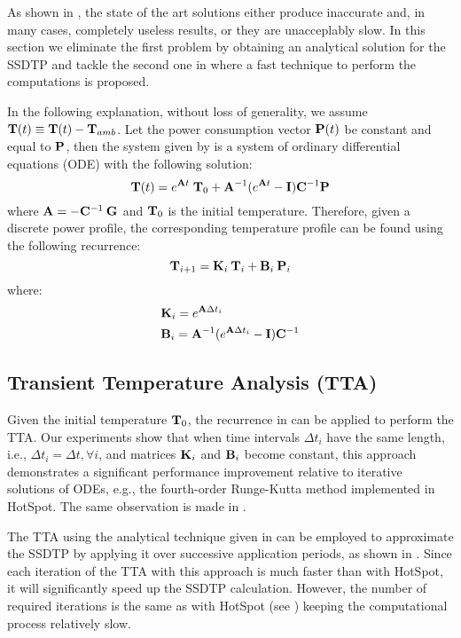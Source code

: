 As shown in , the state of the art solutions either produce inaccurate and, in many cases, completely useless results, or they are unacceplably slow. In this section we eliminate the first problem by obtaining an analytical solution for the SSDTP and tackle the second one in  where a fast technique to perform the computations is proposed.

In the following explanation, without loss of generality, we assume $\mathbf{T}(t) \equiv \mathbf{T}(t) - \mathbf{T}_{amb}$. Let the power consumption vector $\mathbf{P}(t)$ be constant and equal to $\mathbf{P}$, then the system given by  is a system of ordinary differential equations (ODE) with the following solution:
\begin{equation} \label{eq:solution}
  \mathbf{T}(t) = e^{\mathbf{A} t} \; \mathbf{T}_0 + \mathbf{A}^{-1}(e^{\mathbf{A} t} - \mathbf{I})\mathbf{C}^{-1} \mathbf{P}
\end{equation}
where $\mathbf{A} = -\mathbf{C}^{-1} \: \mathbf{G}$ and $\mathbf{T}_0$ is the initial temperature. Therefore, given a discrete power profile, the corresponding temperature profile can be found using the following recurrence:
\begin{equation} \label{eq:recurrent-system}
  \mathbf{T}_{i+1} = \mathbf{K}_i \: \mathbf{T}_i + \mathbf{B}_i \: \mathbf{P}_i
\end{equation}
where:
\begin{align*}
  & \mathbf{K}_i = e^{\mathbf{A} \Delta t_i} \\
  & \mathbf{B}_i = \mathbf{A}^{-1}(e^{\mathbf{A} \Delta t_i} - \mathbf{I})\mathbf{C}^{-1}
\end{align*}

\subsection{Transient Temperature Analysis (TTA)}
Given the initial temperature $\mathbf{T}_0$, the recurrence in  can be applied to perform the TTA. Our experiments show that when time intervals $\Delta t_i$ have the same length, i.e., $\Delta t_i = \Delta t, \forall i$, and matrices $\mathbf{K}_i$ and $\mathbf{B}_i$ become constant, this approach demonstrates a significant performance improvement relative to iterative solutions of ODEs, e.g., the fourth-order Runge-Kutta method implemented in HotSpot. The same observation is made in \cite{thiele2011}.

The TTA using the analytical technique given in  can be employed to approximate the SSDTP by applying it over successive application periods, as shown in . Since each iteration of the TTA with this approach is much faster than with HotSpot, it will significantly speed up the SSDTP calculation. However, the number of required iterations is the same as with HotSpot (see ) keeping the computational process relatively slow.

